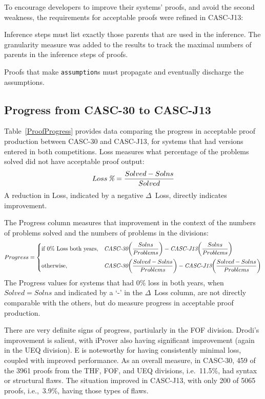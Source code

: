 \documentclass[aic]{iosart2x}
\newcommand{\smalltt}[1]{\small \texttt{#1}}
\newenvironment{packed_enumerate}{
\vspace*{-0.3em}
\begin{enumerate}
  \setlength{\partopsep}{0pt}
  \setlength{\itemsep}{1pt}
  \setlength{\parskip}{0pt}
  \setlength{\parsep}{0pt}
}{\end{enumerate}}
\newcommand{\LAST}{\mbox{CASC-30}}
\newcommand{\THIS}{\mbox{CASC-J13}}
\begin{document}
To encourage developers to improve their systems' proofs, and avoid the second weakness, the 
requirements for acceptable proofs were refined in \THIS{}:
\begin{packed_enumerate}
\item[11.] Inference steps must list exactly those parents that are used in the inference.
      The granularity measure was added to the results to track the maximal numbers of 
           parents in the inference steps of proofs.
\item[12.] Proofs that make \smalltt{assumption}s must propagate and eventually discharge the 
      assumptions.
\end{packed_enumerate}

\subsection{Progress from \LAST{} to \THIS{}}
\label{Progress}

Table~\ref{ProofProgress} provides data comparing the progress in acceptable proof production
between \LAST{} and \THIS{}, for systems that had versions entered in both competitions.
Loss measures what percentage of the problems solved did not have acceptable proof output:
\[
Loss\,\text{\em \%} = 
\dfrac{Solved - Solns}{Solved}
\]
A reduction in Loss, indicated by a negative $\Delta$~Loss, directly indicates improvement.

The Progress column measures that improvement in the context of the numbers of problems
solved and the numbers of problems in the divisions:
\[
Progress = 
\begin{cases}
\text{if 0\% Loss both years} , & \text{\em \LAST{}}\!\left(\dfrac{Solns}{Problems}\right) - \text{\em \THIS{}}\!\left(\dfrac{Solns}{Problems}\right) \\[10pt]
\text{otherwise}              , & \text{\em \LAST{}}\!\left(\dfrac{Solved - Solns}{Problems}\right) - \text{\em \THIS{}}\!\left(\dfrac{Solved - Solns}{Problems}\right)
\end{cases}
\]
The Progress values for systems that had 0\% loss in both years, when $Solved = Solns$ and 
indicated by a `-' in the $\Delta$~Loss column, are not directly comparable with the others, 
but do measure progress in acceptable proof production.

There are very definite signs of progress, partiularly in the FOF division.
Drodi's improvement is salient, with iProver also having significant improvement (again in the
UEQ division).
E is noteworthy for having consistently minimal loss, coupled with improved performance.
As an overall measure, in \LAST{}, 459 of the 3961 proofs from the THF, FOF, and UEQ divisions, 
i.e.~11.5\%, had syntax or structural flaws.
The situation improved in \THIS{}, with only 200 of 5065 proofs, i.e.,~3.9\%, having those types
of flaws.
\end{document}
